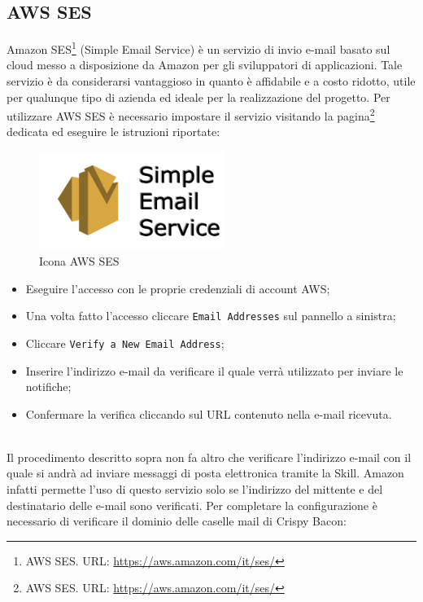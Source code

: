 \subsection{AWS SES}
Amazon SES\footnote{AWS SES. URL: \href{https://aws.amazon.com/it/ses/}{https://aws.amazon.com/it/ses/}} (Simple Email Service) è un servizio di invio e-mail basato sul cloud messo a disposizione da Amazon per gli sviluppatori di applicazioni. Tale servizio è da considerarsi vantaggioso in quanto è affidabile e a costo ridotto, utile per qualunque tipo di azienda ed ideale per la realizzazione del progetto.
\newpage
\noindent Per utilizzare AWS SES è necessario impostare il servizio visitando la pagina\footnote{AWS SES. URL: \href{https://aws.amazon.com/it/ses/}{https://aws.amazon.com/it/ses/}} dedicata ed eseguire le istruzioni riportate:
\\[0.5cm]
\begin{minipage}{0.5\textwidth}
	\begin{figure}[H]
		\includegraphics[width=6cm]{immagini/ses.png}
		\caption{\label{fig:icona_aws_ses}Icona AWS SES}
	\end{figure}
\end{minipage}
\begin{minipage}{0.5\textwidth}
	\begin{itemize}
		\item Eseguire l'accesso con le proprie credenziali di account AWS;
    	\item Una volta fatto l'accesso cliccare \texttt{Email Addresses} sul pannello a sinistra;
    	\item Cliccare \texttt{Verify a New Email Address};
    	\item Inserire l'indirizzo e-mail da verificare il quale verrà utilizzato per inviare le notifiche;
    	\item Confermare la verifica cliccando sul URL contenuto nella e-mail ricevuta.
	\end{itemize}
\end{minipage}
\\[0.5cm]
Il procedimento descritto sopra non fa altro che verificare l'indirizzo e-mail con il quale si andrà ad inviare messaggi di posta elettronica tramite la Skill. Amazon infatti permette l'uso di questo servizio solo se l'indirizzo del mittente e del destinatario delle e-mail sono verificati. Per completare la configurazione è necessario di verificare il dominio delle caselle mail di Crispy Bacon: 
